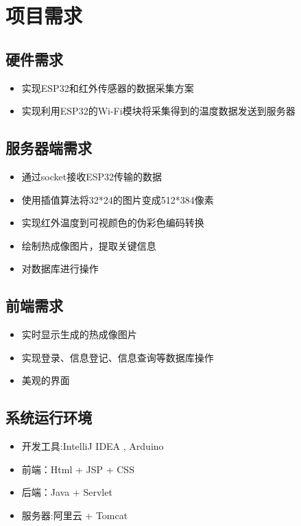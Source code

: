 \chapter{项目需求}
\section{硬件需求}
\begin{itemize}
    \item 实现ESP32和红外传感器的数据采集方案
    \item 实现利用ESP32的Wi-Fi模块将采集得到的温度数据发送到服务器
    \end{itemize}
\section{服务器端需求}
\begin{itemize}
    \item 通过socket接收ESP32传输的数据
    \item 使用插值算法将32*24的图片变成512*384像素
    \item 实现红外温度到可视颜色的伪彩色编码转换
    \item 绘制热成像图片，提取关键信息
    \item 对数据库进行操作
    \end{itemize}
\section{前端需求}
\begin{itemize}
    \item 实时显示生成的热成像图片
    \item 实现登录、信息登记、信息查询等数据库操作
    \item 美观的界面
    \end{itemize}
\section{系统运行环境}
\begin{itemize}
    \item 开发工具:IntelliJ IDEA , Arduino
    \item 前端：Html + JSP + CSS
    \item 后端：Java + Servlet
    \item 服务器:阿里云 + Tomcat
    \end{itemize}
